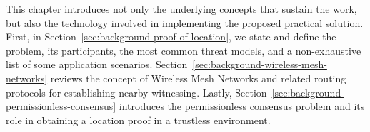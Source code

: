 This chapter introduces not only the underlying concepts that sustain the work, but also the technology involved in implementing the proposed practical solution. First, in Section~\ref{sec:background-proof-of-location}, we state and define the \pol{} problem, its participants, the most common threat models, and a non-exhaustive list of some application scenarios. Section~\ref{sec:background-wireless-mesh-networks} reviews the concept of Wireless Mesh Networks and related routing protocols for establishing nearby witnessing. Lastly, Section~\ref{sec:background-permissionless-consensus} introduces the permissionless consensus problem and its role in obtaining a location proof in a trustless environment.
